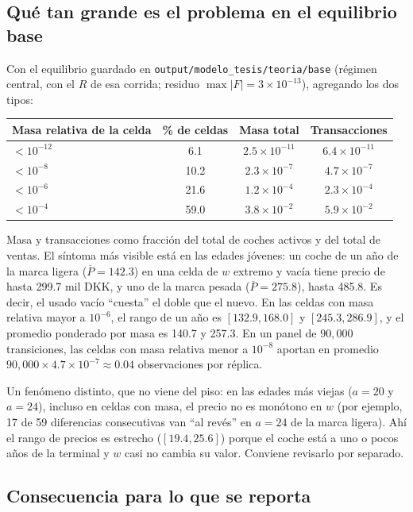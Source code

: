 \documentclass{article}
\begin{document}
\subsection{Qué tan grande es el problema en el equilibrio base}

Con el equilibrio guardado en \texttt{output/modelo\_tesis/teoria/base} (régimen central, con el $R$
de esa corrida; residuo $\max|F|=3\times10^{-13}$), agregando los dos tipos:

\begin{center}
\begin{tabular}{lccc}
\toprule
Masa relativa de la celda & \% de celdas & Masa total & Transacciones\\
\midrule
$<10^{-12}$ & 6.1 & $2.5\times10^{-11}$ & $6.4\times10^{-11}$\\
$<10^{-8}$  & 10.2 & $2.3\times10^{-7}$ & $4.7\times10^{-7}$\\
$<10^{-6}$  & 21.6 & $1.2\times10^{-4}$ & $2.3\times10^{-4}$\\
$<10^{-4}$  & 59.0 & $3.8\times10^{-2}$ & $5.9\times10^{-2}$\\
\bottomrule
\end{tabular}
\end{center}

\noindent Masa y transacciones como fracción del total de coches activos y del total de ventas.
El síntoma más visible está en las edades jóvenes: un coche de un año de la marca ligera
($\overline P=142.3$) en una celda de $w$ extremo y vacía tiene precio de hasta 299.7 mil DKK, y uno de la
marca pesada ($\overline P=275.8$), hasta 485.8. Es decir, el usado vacío ``cuesta'' el doble que el nuevo.
En las celdas con masa relativa mayor a $10^{-6}$, el rango de un año es $[132.9,168.0]$ y $[245.3,286.9]$,
y el promedio ponderado por masa es 140.7 y 257.3. En un panel de $90{,}000$ transiciones, las celdas
con masa relativa menor a $10^{-8}$ aportan en promedio $90{,}000\times4.7\times10^{-7}\approx0.04$
observaciones por réplica.

Un fenómeno distinto, que no viene del piso: en las edades más viejas ($a=20$ y $a=24$), incluso en
celdas con masa, el precio no es monótono en $w$ (por ejemplo, 17 de 59 diferencias consecutivas van
``al revés'' en $a=24$ de la marca ligera). Ahí el rango de precios es estrecho ($[19.4,25.6]$) porque el
coche está a uno o pocos años de la terminal y $w$ casi no cambia su valor. Conviene revisarlo por
separado.

\subsection{Consecuencia para lo que se reporta}
\end{document}
